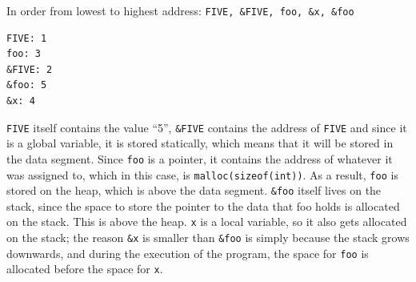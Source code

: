 \begin{blocksection}
\begin{solution}
In order from lowest to highest address: \lstinline$FIVE, &FIVE, foo, &x, &foo$
\begin{verbatim}
FIVE: 1
foo: 3
&FIVE: 2
&foo: 5
&x: 4
\end{verbatim}


\lstinline$FIVE$ itself contains the value “5”, \lstinline$&FIVE$ contains the address of \lstinline$FIVE$ and since it is a global variable, it is stored statically, which means that it will be stored in the data segment. Since \lstinline$foo$ is a pointer, it contains the address of whatever it was assigned to, which in this case, is \lstinline$malloc(sizeof(int))$. As a result, \lstinline$foo$ is stored on the heap, which is above the data segment. \lstinline$&foo$ itself lives on the stack, since the space to store the pointer to the data that foo holds is allocated on the stack. This is above the heap. \lstinline$x$ is a local variable, so it also gets allocated on the stack; the reason \lstinline$&x$ is smaller than \lstinline$&foo$ is simply because the stack grows downwards, and during the execution of the program, the space for \lstinline$foo$ is allocated before the space for \lstinline$x$.
\end{solution}

\end{blocksection}